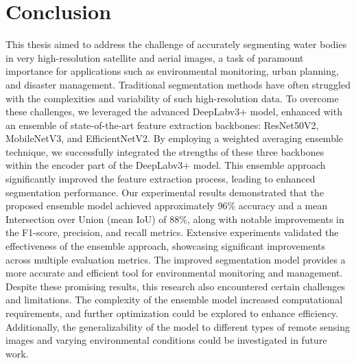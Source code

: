 \section{Conclusion}
This thesis aimed to address the challenge of accurately segmenting water bodies in very high-resolution satellite and aerial images, a task of paramount importance for applications such as environmental monitoring, urban planning, and disaster management. Traditional segmentation methods have often struggled with the complexities and variability of such high-resolution data. To overcome these challenges, we leveraged the advanced DeepLabv3+ model, enhanced with an ensemble of state-of-the-art feature extraction backbones: ResNet50V2, MobileNetV3, and EfficientNetV2.
By employing a weighted averaging ensemble technique, we successfully integrated the strengths of these three backbones within the encoder part of the DeepLabv3+ model. This ensemble approach significantly improved the feature extraction process, leading to enhanced segmentation performance. Our experimental results demonstrated that the proposed ensemble model achieved approximately 96\% accuracy and a mean Intersection over Union (mean IoU) of 88\%, along with notable improvements in the F1-score, precision, and recall metrics.
 Extensive experiments validated the effectiveness of the ensemble approach, showcasing significant improvements across multiple evaluation metrics.
 The improved segmentation model provides a more accurate and efficient tool for environmental monitoring and management.
Despite these promising results, this research also encountered certain challenges and limitations. The complexity of the ensemble model increased computational requirements, and further optimization could be explored to enhance efficiency. Additionally, the generalizability of the model to different types of remote sensing images and varying environmental conditions could be investigated in future work.




